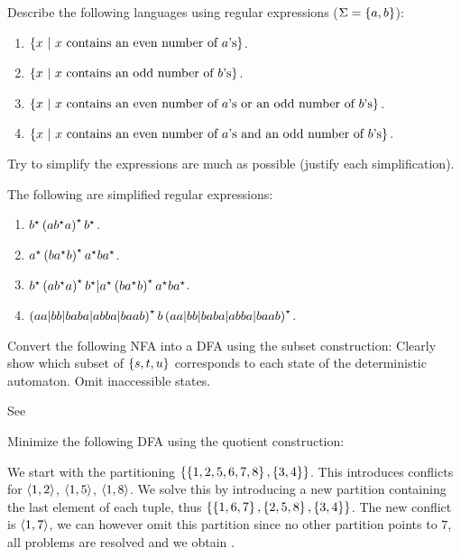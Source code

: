 \documentclass{article}
\begin{document}
\begin{exercise}
Describe the following languages using regular expressions ($\Sigma=\left\{ a,b \right\}$):
\begin{enumerate}
 \item $\left\{ x\ |\ \mbox{$x$ contains an even number of $a$'s} \right\}$.
 \item $\left\{ x\ |\ \mbox{$x$ contains an odd number of $b$'s} \right\}$.
 \item $\left\{ x\ |\ \mbox{$x$ contains an even number of $a$'s or an odd number of $b$’s} \right\}$.
 \item $\left\{ x\ |\ \mbox{$x$ contains an even number of $a$'s and an odd number of $b$’s} \right\}$.
\end{enumerate}
Try to simplify the expressions are much as possible (justify each simplification).
\begin{answer}
The following are simplified regular expressions:
\begin{enumerate}
 \item $b^{\star}\left( ab^{\star}a \right)^{\star}b^{\star}$.
 \item $a^{\star}\left( ba^{\star}b \right)^{\star}a^{\star}ba^{\star}$.
 \item $b^{\star}\left( ab^{\star}a \right)^{\star}b^{\star}|a^{\star}\left( ba^{\star}b \right)^{\star}a^{\star}ba^{\star}$.
 \item $\left( aa|bb|baba|abba|baab \right)^{\star}b\left( aa|bb|baba|abba|baab \right)^{\star}$.
\end{enumerate}
\end{answer}
\end{exercise}
\begin{exercise}
Convert the following NFA into a DFA using the subset construction:
Clearly show which subset of $\left\{ s,t,u \right\}$ corresponds to each state of the deterministic automaton. Omit inaccessible states.
\begin{answer}See 
\end{answer}
\end{exercise}
\begin{exercise}
Minimize the following DFA using the quotient construction:
\begin{answer}
We start with the partitioning $\left\{ \left\{ 1,2,5,6,7,8 \right\},\left\{ 3,4 \right\} \right\}$. This introduces conflicts for $\left\langle 1,2 \right\rangle$, $\left\langle 1,5 \right\rangle$, $\left\langle 1,8 \right\rangle$. We solve this by introducing a new partition containing the last element of each tuple, thus $\left\{ \left\{ 1,6,7 \right\},\left\{ 2,5,8 \right\},\left\{ 3,4 \right\} \right\}$. The new conflict is $\left\langle 1,7 \right\rangle$, we can however omit this partition since no other partition points to $7$, all problems are resolved and we obtain .
\end{answer}
\end{exercise}
\end{document}

